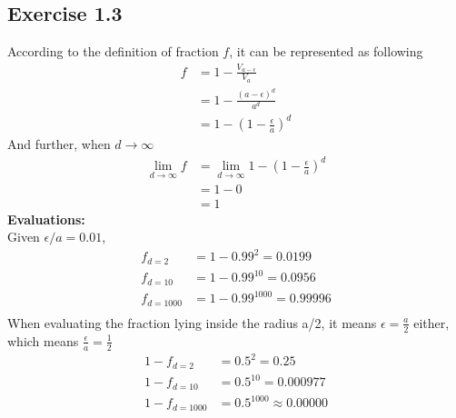\documentclass{article} %
\begin{document}
\subsection{Exercise 1.3}
According to the definition of fraction $f$, it can be represented as following
\begin{equation}
    \begin{split}
     	f & = 1 - \frac{V_{a-\epsilon}}{V_a}  \\
  	      & = 1 - \frac{{(a-\epsilon)}^{d}}{a^d}\\
	      & =1 - (1-\frac{\epsilon}{a})^d
    \end{split}
\end{equation}
And further, when $d \to \infty$
\begin{equation}
    \begin{split}
     	\lim\limits_{d \to \infty}^{} f & =  \lim\limits_{d \to \infty}^{}  1 - (1-\frac{\epsilon}{a})^d \\
	& = 1 - 0 \\
	& = 1
    \end{split}
\end{equation}
\textbf{Evaluations:}\\
Given $\epsilon / a = 0.01$,
\begin{equation}
    \begin{split}
        f_{d=2} &= 1 - 0.99^2 = 0.0199 \\
        f_{d=10} &= 1 - 0.99^{10} = 0.0956 \\
        f_{d=1000} &= 1 - 0.99^{1000} = 0.99996 \\
    \end{split}
\end{equation}
When evaluating the fraction lying inside the radius a/2, it means $\epsilon=\frac{a}{2}$ either, which means $\frac{\epsilon}{a}=\frac{1}{2}$
\begin{equation}
    \begin{split}
        1- f_{d=2} &= 0.5^2 = 0.25 \\
        1- f_{d=10} &= 0.5^{10} = 0.000977 \\
        1- f_{d=1000}& = 0.5^{1000} \approx 0.00000 \\
    \end{split}
\end{equation}
\end{document}
